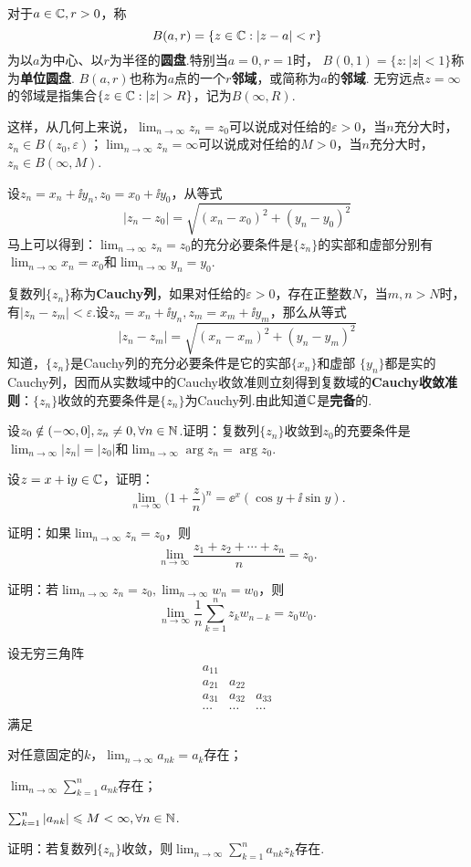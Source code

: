 对于$a\in\mathbb C,r>0$，称
\[B(a,r)=\{z\in\mathbb C:|z-a|<r\}\]
为以$a$为中心、以$r$为半径的\textbf{圆盘}.特别当$a=0,r=1$时， $B(0,1)=\{z:|z|<1\}$称为\textbf{单位圆盘}. $B(a,r)$也称为$a$点的一个\textbf{$r$邻域}，或简称为$a$的\textbf{邻域}. 无穷远点$z=\infty$的邻域是指集合$\{z\in\MC:|z|>R\}$，记为$B(\infty,R)$.

这样，从几何上来说，$\lim_{n\to\infty}z_n=z_0$可以说成对任给的$\varepsilon>0$，当$n$充分大时，$z_n\in B(z_0,\varepsilon)$；$\lim_{n\to\infty}z_n=\infty$可以说成对任给的$M>0$，当$n$充分大时，$z_n\in B(\infty,M)$.

设$z_n=x_n+\ii y_n,z_0=x_0+\ii y_0$，从等式
\[
  |z_n - z_0| = \sqrt{(x_n-x_0)^2 + (y_n-y_0)^2}
\]
马上可以得到：$\lim_{n\to\infty}z_n=z_0$的充分必要条件是$\{z_n\}$的实部和虚部分别有$\lim_{n\to\infty}x_n=x_0$和$\lim_{n\to\infty}y_n=y_0$.

复数列$\{z_n\}$称为\textbf{Cauchy列}，如果对任给的$\varepsilon>0$，存在正整数$N$，当$m,n>N$时，有$|z_n-z_m|<\varepsilon$.设$z_n=x_n+\ii y_n,z_m=x_m+\ii y_m$，那么从等式
\[
  |z_n-z_m| = \sqrt{(x_n-x_m)^2+(y_n-y_m)^2}
\]
知道，$\{z_n\}$是Cauchy列的充分必要条件是它的实部$\{x_n\}$和虚部
$\{y_n\}$都是实的Cauchy列，因而从实数域中的Cauchy收敛准则立刻得到复数域的\textbf{Cauchy收敛准则}：$\{z_n\}$收敛的充要条件是$\{z_n\}$为Cauchy列.由此知道$\mathbb C$是\textbf{完备}的.

\begin{xiti}
  \item 设$z_0\notin(-\infty,0],z_n\ne0,\forall n\in\mathbb N$.证明：复数列$\{z_n\}$收敛到$z_0$的充要条件是$\lim_{n\to\infty}|z_n|=|z_0|$和$\lim_{n\to\infty}\arg z_n=\arg z_0$.
  \item 设$z=x+\mathrm i y\in\mathbb C$，证明：
     \[
       \lim_{n\to\infty} \bigg( 1+\frac zn \bigg)^n = \ee^x(\cos y + \ii\sin y).
     \]
  \item 证明：如果$\lim_{n\to\infty}z_n=z_0$，则
     \[
       \lim_{n\to\infty} \frac{z_1 + z_2 + \cdots + z_n}n = z_0.
     \]
  \item 证明：若$\lim_{n\to\infty}z_n=z_0,\lim_{n\to\infty}w_n=w_0$，则
     \[
       \lim_{n\to\infty} \frac1n\sum_{k=1}^nz_kw_{n-k} = z_0w_0.
     \]
  \item 设无穷三角阵
     \[
       \begin{matrix}
         a_{11} &\\
         a_{21} & a_{22}\\
         a_{31} & a_{32} & a_{33}\\
         \cdots & \cdots & \cdots
       \end{matrix}
     \]
  满足
  \begin{enuma}
    \item 对任意固定的$k$，$\lim_{n\to\infty}a_{nk}=a_k$存在；
    \item $\lim_{n\to\infty}\sum_{k=1}^na_{nk}$存在；
    \item $\sum_{k=1}^n|a_{nk}|\leqslant M<\infty,\forall n\in \mathbb N$.
  \end{enuma}
  证明：若复数列$\{z_n\}$收敛，则$\lim_{n\to\infty}\sum_{k=1}^na_{nk}z_k$存在.
\end{xiti}

